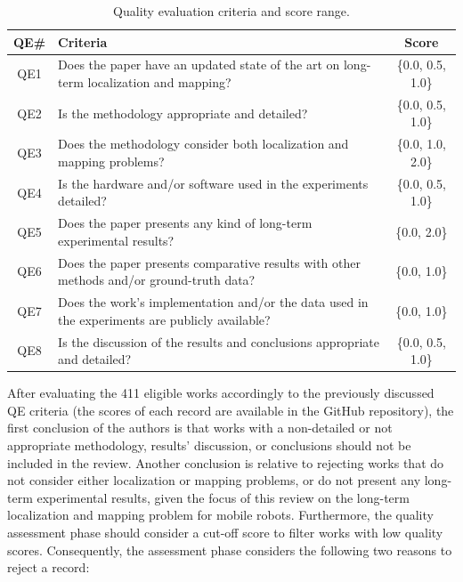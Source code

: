 \begin{table}[h]
  \renewcommand{\arraystretch}{1.25}
  \setlength{\tabcolsep}{3pt}
  \caption[Quality evaluation criteria and score range.]{Quality evaluation criteria and score range.}
  \label{tab:methodology:quality-assessment}
  \centering
  {\scriptsize
  \begin{tabular}{c m{} c}

\hline
\textbf{QE\#} & \textbf{Criteria} & \textbf{Score}\\
\hline
QE1 &
Does the paper have an updated state of the art on long-term localization and mapping? &
\{0.0, 0.5, 1.0\}\\
\hline
QE2 &
Is the methodology appropriate and detailed? &
\{0.0, 0.5, 1.0\}\\
\hline
QE3 &
Does the methodology consider both localization and mapping problems? &
\{0.0, 1.0, 2.0\}\\
\hline
QE4 &
Is the hardware and/or software used in the experiments detailed? &
\{0.0, 0.5, 1.0\}\\
\hline
QE5 &
Does the paper presents any kind of long-term experimental results? &
\{0.0, 2.0\}\\
\hline
QE6 &
Does the paper presents comparative results with other methods and/or ground-truth data? &
\{0.0, 1.0\}\\
\hline
QE7 &
Does the work's implementation and/or the data used in the experiments are publicly available? &
\{0.0, 1.0\}\\
\hline
QE8 &
Is the discussion of the results and conclusions appropriate and detailed? &
\{0.0, 0.5, 1.0\}\\
\hline

  \end{tabular}}
\end{table}

After evaluating the 411 eligible works accordingly to the previously discussed QE criteria (the scores of each record are available in the GitHub repository), the first conclusion of the authors is that works with a non-detailed or not appropriate methodology, results' discussion, or conclusions should not be included in the review. Another conclusion is relative to rejecting works that do not consider either localization or mapping problems, or do not present any long-term experimental results, given the focus of this review on the long-term localization and mapping problem for mobile robots. Furthermore, the quality assessment phase should consider a cut-off score to filter works with low quality scores. Consequently, the assessment phase considers the following two reasons to reject a record:

